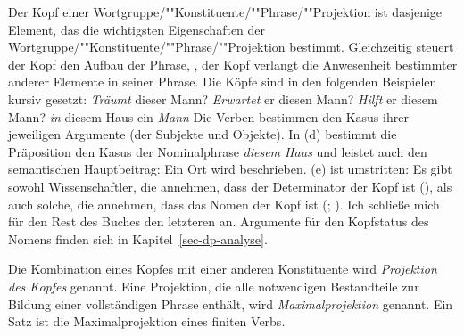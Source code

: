 Der Kopf einer Wortgruppe/""Konstituente/""Phrase/""Projektion ist dasjenige Element,
das die wichtigsten Eigenschaften der Wortgruppe/""Konstituente/""Phrase/""Projektion bestimmt.
Gleichzeitig steuert der Kopf den Aufbau der Phrase, \dash, der Kopf verlangt
die Anwesenheit bestimmter anderer Elemente in seiner Phrase. Die Köpfe sind
in den folgenden Beispielen kursiv gesetzt:
\eal
\ex \emph{Träumt} dieser Mann?
\ex \emph{Erwartet} er diesen Mann?
\ex \emph{Hilft} er diesem Mann?
\ex \emph{in} diesem Haus
\ex ein \emph{Mann}
\zl
Die Verben bestimmen den Kasus ihrer jeweiligen Argumente (der Subjekte und Objekte).
In (d) bestimmt die Präposition den Kasus der Nominalphrase \emph{diesem Haus} und
leistet auch den semantischen Hauptbeitrag: Ein Ort wird beschrieben. (e)
ist umstritten: Es gibt sowohl Wissenschaftler, die annehmen, dass der Determinator
der Kopf ist (\citealp{Hellan86a,Abney87a,Netter94,Netter98a}), als auch solche, die annehmen,
dass das Nomen der Kopf ist (\citealp[]{ps2}; \citealp{Demske2001a}).
Ich schließe mich für den Rest des Buches den letzteren an. Argumente für den Kopfstatus des Nomens
finden sich in Kapitel~\ref{sec-dp-analyse}.

Die Kombination eines Kopfes mit einer anderen Konstituente wird \emph{Projektion
des Kopfes} genannt. Eine Projektion, die alle notwendigen Bestandteile zur Bildung
einer vollständigen Phrase enthält, wird \emph{Maximalprojektion}
genannt. Ein Satz ist die Maximalprojektion eines finiten Verbs.

